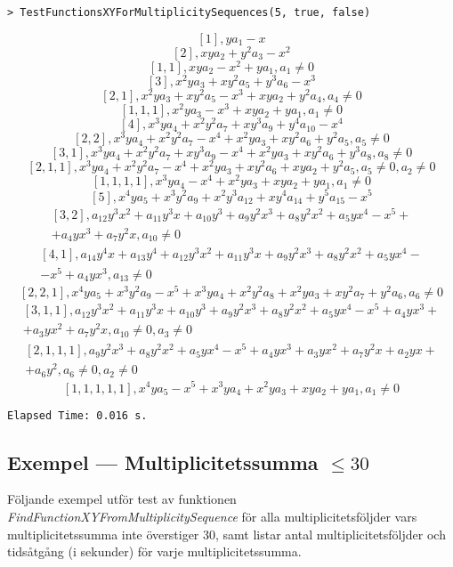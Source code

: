 \begin{verbatim}
> TestFunctionsXYForMultiplicitySequences(5, true, false)
\end{verbatim}
\[[1], ya_1-x\]
\[[2], xya_2+y^2a_3-x^2\]
\[[1,1], xya_2-x^2+ya_1,a_1\neq 0\]
\[[3],x^2ya_3+xy^2a_5+y^3a_6-x^3\]
\[[2,1],x^2ya_3+xy^2a_5-x^3+xya_2+y^2a_4,a_4\neq 0\]
\[[1,1,1],x^2ya_3-x^3+xya_2+ya_1,a_1\neq 0\]
\[[4], x^3ya_4+x^2y^2a_7+xy^3a_9+y^4a_{10}-x^4\]
\[[2,2], x^3ya_4+x^2y^2a_7-x^4+x^2ya_3+xy^2a_6+y^2a_5, a_5\neq 0\]
\[[3,1],x^3ya_4+x^2y^2a_7+xy^3a_9-x^4+x^2ya_3+xy^2a_6+y^3a_8,a_8\neq 0\]
\[[2,1,1], x^3ya_4+x^2y^2a_7-x^4+x^2ya_3+xy^2a_6+xya_2+y^2a_5, a_5\neq 0, a_2\neq 0\]
\[[1,1,1,1], x^3ya_4-x^4+x^2ya_3+xya_2+ya_1,a_1\neq 0\]
\[[5], x^4ya_5+x^3y^2a_9+x^2y^3a_{12}+xy^4a_{14}+y^5a_{15}-x^5\]
\[
\begin{array}{c}
[3,2], a_{12}y^3x^2+a_{11}y^3x+a_{10}y^3+a_9y^2x^3+a_8y^2x^2+a_5yx^4-x^5+
\\+a_4yx^3+a_7y^2x, a_{10}\neq 0
\end{array}
\]
\[
\begin{array}{c}
[4,1], a_{14}y^4x+a_{13}y^4+a_{12}y^3x^2+a_{11}y^3x+a_9y^2x^3+a_8y^2x^2+a_5yx^4-\\
-x^5+a_4yx^3, a_{13}\neq 0
\end{array}
\]
\[[2,2,1], x^4ya_5+x^3y^2a_9-x^5+x^3ya_4+x^2y^2a_8+x^2ya_3+xy^2a_7+y^2a_6,a_6\neq 0\]
\[
\begin{array}{c}
[3,1,1], a_{12}y^3x^2+a_{11}y^3x+a_{10}y^3+a_9y^2x^3+a_8y^2x^2+a_5yx^4-x^5+a_4yx^3+\\
+a_3yx^2+a_7y^2x, a_{10}\neq 0, a_3\neq 0
\end{array}
\]
\[
\begin{array}{c}
[2,1,1,1], a_9y^2x^3+a_8y^2x^2+a_5yx^4-x^5+a_4yx^3+a_3yx^2+a_7y^2x+a_2yx+\\
+a_6y^2, a_6\neq 0, a_2\neq 0 
\end{array}
\]
\[[1,1,1,1,1], x^4ya_5-x^5+x^3ya_4+x^2ya_3+xya_2+ya_1, a_1\neq 0\]
\begin{verbatim}
Elapsed Time: 0.016 s.
\end{verbatim}

\subsection{Exempel --- Multiplicitetssumma $\leq 30$}
\label{TestFindFunctionXYFromMultiplicitySequence}

Följande exempel utför test av funktionen \emph{FindFunctionXYFromMultiplicitySequence} för alla multiplicitetsföljder vars multiplicitetssumma inte överstiger 30, samt listar antal multiplicitetsföljder och tidsåtgång (i sekunder) för varje multiplicitetssumma.

